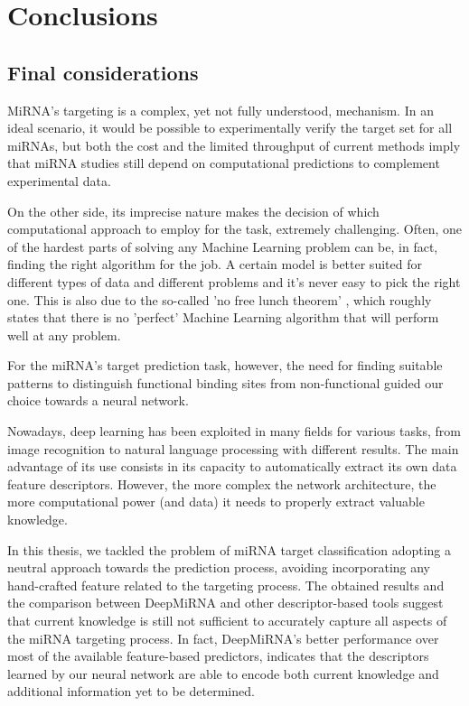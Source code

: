 
\chapter{Conclusions} %

\label{Chapter7} %

\section{Final considerations}
MiRNA's targeting is a complex, yet not fully understood, mechanism. In an ideal scenario, it would be possible to experimentally verify the target set for all miRNAs, but both the cost and the limited throughput of current methods imply that miRNA studies still depend on computational predictions to complement experimental data.

On the other side, its imprecise nature makes the decision of which computational approach to employ for the task, extremely challenging. Often, one of the hardest parts of solving any Machine Learning problem can be, in fact, finding the right algorithm for the job. A certain model is better suited for different types of data and different problems and it's never easy to pick the right one. This is also due to the so-called 'no free lunch theorem' \cite{nfl}, which roughly states that there is no 'perfect' Machine Learning algorithm that will perform well at any problem.

For the miRNA's target prediction task, however, the need for finding suitable patterns to distinguish functional binding sites from non-functional guided our choice towards a neural network. 

Nowadays, deep learning has been exploited in many fields for various tasks, from image recognition to natural language processing with different results. The main advantage of its use consists in its capacity to automatically extract its own data feature descriptors. However, the more complex the network architecture, the more computational power (and data) it needs to properly extract valuable knowledge.

In this thesis, we tackled the problem of miRNA target classification adopting a neutral approach towards the prediction process, avoiding incorporating any hand-crafted feature related to the targeting process. The obtained results and the comparison between DeepMiRNA and other descriptor-based tools suggest that current knowledge is still not sufficient to accurately capture all aspects of the miRNA targeting process. In fact, DeepMiRNA's better performance over most of the available feature-based predictors, indicates that the descriptors learned by our neural network are able to encode both current knowledge and additional information yet to be determined.   

